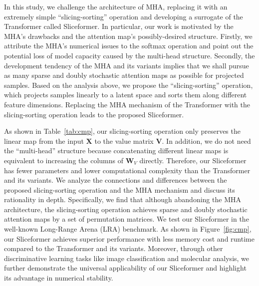 In this study, we challenge the architecture of MHA, replacing it with an extremely simple ``slicing-sorting'' operation and developing a surrogate of the Transformer called Sliceformer. 
In particular, our work is motivated by the MHA's drawbacks and the attention map's possibly-desired structure. 
Firstly, we attribute the MHA's numerical issues to the softmax operation and point out the potential loss of model capacity caused by the multi-head structure. 
Secondly, the development tendency of the MHA and its variants implies that we shall pursue as many sparse and doubly stochastic attention maps as possible for projected samples. 
Based on the analysis above, we propose the ``slicing-sorting'' operation, which projects samples linearly to a latent space and sorts them along different feature dimensions. 
Replacing the MHA mechanism of the Transformer with the slicing-sorting operation leads to the proposed Sliceformer.



As shown in Table~\ref{tab:cmp}, our slicing-sorting operation only preserves the linear map from the input $\bm{X}$ to the value matrix $\bm{V}$. 
In addition, we do not need the ``multi-head'' structure because concatenating different linear maps is equivalent to increasing the columns of $\bm{W}_V$ directly. 
Therefore, our Sliceformer has fewer parameters and lower computational complexity than the Transformer and its variants. 
We analyze the connections and differences between the proposed slicing-sorting operation and the MHA mechanism and discuss its rationality in depth. 
Specifically, we find that although abandoning the MHA architecture, the slicing-sorting operation achieves sparse and doubly stochastic attention maps by a set of permutation matrices. 
We test our Sliceformer in the well-known Long-Range Arena (LRA) benchmark. 
As shown in Figure~\ref{fig:cmp}, our Sliceformer achieves superior performance with less memory cost and runtime compared to the Transformer and its variants. 
Moreover, through other discriminative learning tasks like image classification and molecular analysis, we further demonstrate the universal applicability of our Sliceformer and highlight its advantage in numerical stability.